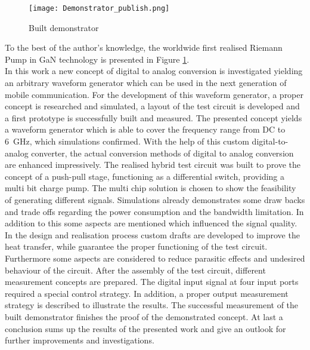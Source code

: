 \begin{figure}[h] %
	\centering
  \texttt{[image: Demonstrator\_publish.png]}
	\caption{Built demonstrator}
	\label{fig:Demonstrator}
\end{figure}
To the best of the author's knowledge, the worldwide first realised Riemann Pump in GaN technology is presented in Figure \ref{fig:Demonstrator}.\\

In this work a new concept of digital to analog conversion is investigated yielding an arbitrary waveform generator which can be used in the next generation of mobile communication.
For the development of this waveform generator, a proper concept is researched and simulated, a layout of the test circuit is developed and a first prototype is successfully built and measured.
The presented concept yields a waveform generator which is able to cover the frequency range from DC to \SI{6}{\giga \hertz}, which simulations confirmed.
With the help of this custom digital-to-analog converter, the actual conversion methods of digital to analog conversion are enhanced impressively.
The realised hybrid test circuit was built to prove the concept of a push-pull stage, functioning as a differential switch, providing a multi bit charge pump.
The multi chip solution is chosen to show the feasibility of generating different signals.
Simulations already demonstrates some draw backs and trade offs regarding the power consumption and the bandwidth limitation.
In addition to this some aspects are mentioned which influenced the signal quality.
In the design and realisation process custom drafts are developed to improve the heat transfer, while guarantee the proper functioning of the test circuit.
Furthermore some aspects are considered to reduce parasitic effects and undesired behaviour of the circuit.
After the assembly of the test circuit, different measurement concepts are prepared.
The digital input signal at four input ports required a special control strategy.
In addition, a proper output measurement strategy is described to illustrate the results.
The successful measurement of the built demonstrator finishes the proof of the demonstrated concept.
At last a conclusion sums up the results of the presented work and give an outlook for further improvements and investigations.





